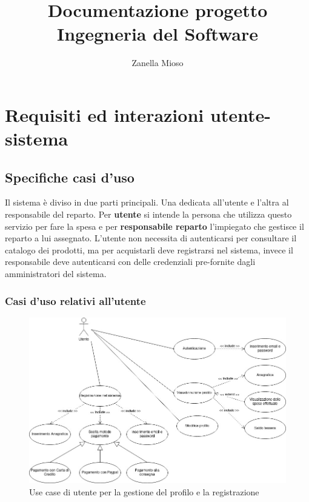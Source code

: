 \documentclass{article}
\author{Zanella Mioso}
\title{Documentazione progetto Ingegneria del Software}
\begin{document}
\maketitle

\newpage

\tableofcontents

\newpage

\section{Requisiti ed interazioni utente-sistema}

\subsection{Specifiche casi d’uso}

Il sistema è diviso in due parti principali. Una dedicata all'utente e l'altra
al responsabile del reparto. Per \textbf{utente} si intende la persona che utilizza questo
servizio per fare la spesa e per \textbf{responsabile reparto} l'impiegato che gestisce
il reparto a lui assegnato. L’utente non necessita di autenticarsi per consultare il
catalogo dei prodotti, ma per acquistarli deve registrarsi nel sistema, invece il
responsabile deve autenticarsi con delle credenziali pre-fornite dagli amministratori
del sistema.

\subsubsection{Casi d'uso relativi all'utente}

\begin{figure}[h!]
	\centering
	\includegraphics[width=\textwidth]{UseCaseUtenteGestioneProfilo.jpg}
	\caption{Use case di utente per la gestione del profilo e la registrazione}
	\label{fig:UseCaseUtenteGestioneProfilo}
\end{figure}
\end{document}
